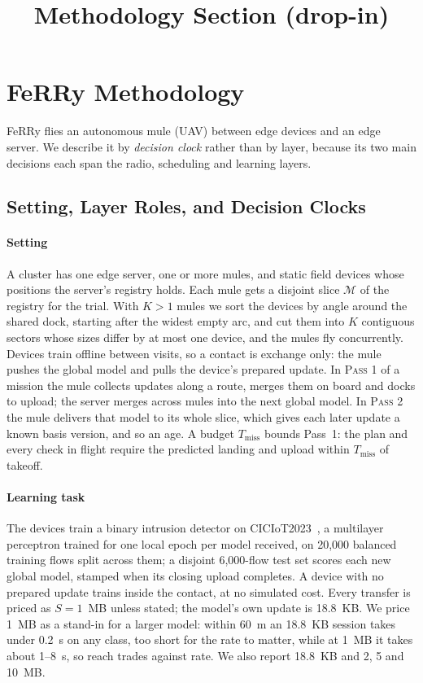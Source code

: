 \documentclass[conference]{IEEEtran}
\newcommand{\sysname}{FeRRy}
\begin{document}
\title{Methodology Section (drop-in)}
\maketitle

\section{\sysname{} Methodology}
\label{sec:method}

\sysname{} flies an autonomous mule (UAV) between edge devices and an edge
server. We describe it by \emph{decision clock} rather than by layer, because
its two main decisions each span the radio, scheduling and learning layers.

\subsection{Setting, Layer Roles, and Decision Clocks}
\label{sec:method:roles}

\paragraph{Setting}
A cluster has one edge server, one or more mules, and static field devices whose
positions the server's registry holds. Each mule gets a disjoint slice
$\mathcal{M}$ of the registry for the trial. With $K>1$ mules we sort the devices
by angle around the shared dock, starting after the widest empty arc, and cut them
into $K$ contiguous sectors whose sizes differ by at most one device, and the
mules fly concurrently. Devices train offline between visits, so a contact is
exchange only: the mule pushes the global model and pulls the device's prepared
update. In \textsc{Pass 1} of a mission the mule collects updates along a route,
merges them on board and docks to upload; the server merges across mules into
the next global model. In \textsc{Pass 2} the mule delivers that model to its
whole slice, which gives each later update a known basis version, and so an age.
A budget $T_{\mathrm{miss}}$ bounds Pass~1: the plan and every check in flight
require the predicted landing and upload within $T_{\mathrm{miss}}$ of takeoff.

\paragraph{Learning task}
The devices train a binary intrusion detector on CICIoT2023~\cite{CiCIoT2023}, a
multilayer perceptron trained for one local epoch per model received, on 20{,}000
balanced training flows split across them; a disjoint 6{,}000-flow test set
scores each new global model, stamped when its closing upload completes. A device
with no prepared update trains inside the contact, at no simulated cost. Every
transfer is priced as $S=1$~MB unless stated; the model's own update is
18.8~KB. We price 1~MB as a stand-in for a larger model: within 60~m an 18.8~KB
session takes under 0.2~s on any class, too short for the rate to matter, while at
1~MB it takes about 1--8~s, so reach trades against rate. We also report 18.8~KB
and 2, 5 and 10~MB.
\end{document}
